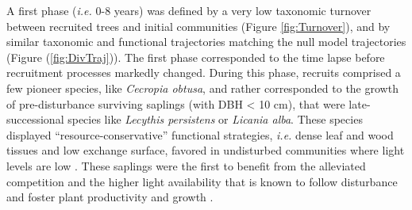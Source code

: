 \documentclass[fleqn,10pt]{ArtEcoFoG} %
\begin{document}
A first phase (\emph{i.e.} 0-8 years) was defined by a very low
taxonomic turnover between recruited trees and initial communities
(Figure \ref{fig:Turnover}), and by similar taxonomic and functional
trajectories matching the null model trajectories (Figure
(\ref{fig:DivTraj})). The first phase corresponded to the time lapse
before recruitment processes markedly changed. During this phase,
recruits comprised a few pioneer species, like \emph{Cecropia obtusa},
and rather corresponded to the growth of pre-disturbance surviving
saplings (with DBH \textless{} 10 cm), that were late-successional
species like \emph{Lecythis persistens} or \emph{Licania alba}. These
species displayed ``resource-conservative'' functional strategies,
\emph{i.e.} dense leaf and wood tissues and low exchange surface,
favored in undisturbed communities where light levels are low
\citep{Peet1992, Denslow2000}. These saplings were the first to benefit
from the alleviated competition and the higher light availability that
is known to follow disturbance and foster plant productivity and growth
\citep{Monteith1972, Chazdon1984}.
\end{document}
